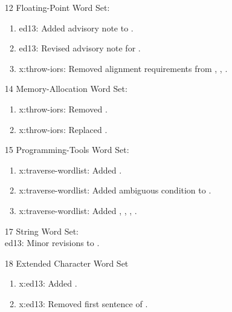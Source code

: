 \begin{itemize}
	\item[12] Floating-Point Word Set:			%
		\begin{enumerate}
		\item \textsf{ed13}: Added advisory note to .
		\item \textsf{ed13}: Revised advisory note for .
		\item \textsf{x:throw-iors}: Removed alignment requirements from
			,
			,
			.
		\end{enumerate}

	\item[14] Memory-Allocation Word Set:		%
		\begin{enumerate}
		\item \textsf{x:throw-iors}: Removed .
		\item \textsf{x:throw-iors}: Replaced .
		\end{enumerate}

	\item[15] Programming-Tools Word Set:		%
		\begin{enumerate}
		\item \textsf{x:traverse-wordlist}: Added .
		\item \textsf{x:traverse-wordlist}: Added ambiguous condition to .
		\item \textsf{x:traverse-wordlist}: Added
			,
			,
			,
			.
		\end{enumerate}

	\item[17] String Word Set:						%
		~ \\
		\textsf{ed13}: Minor revisions to .

	\item[18] Extended Character Word Set		%
		\begin{enumerate}
		\item \textsf{x:ed13}: Added .
		\item \textsf{x:ed13}: Removed first sentence of .
		\end{enumerate}


\end{itemize}
